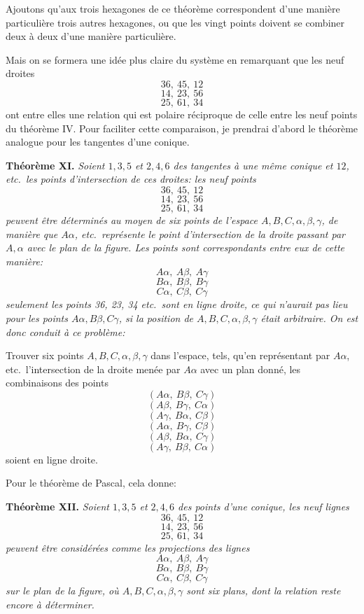 \documentclass[12pt,a4paper]{article}
\begin{document}
Ajoutons qu'aux trois hexagones de ce th\'eor\`eme correspondent d'une mani\`ere particuli\`ere trois autres hexagones, ou que les vingt points doivent se combiner deux \`a deux d'une mani\`ere particuli\`ere.

Mais on se formera une id\'ee plus claire du syst\`eme en remarquant que les neuf droites
\[
36,\ 45,\ 12
\]
\[
14,\ 23,\ 56
\]
\[
25,\ 61,\ 34
\]
ont entre elles une relation qui est polaire r\'eciproque de celle entre les neuf points du th\'eor\`eme IV. Pour faciliter cette comparaison, je prendrai d'abord le th\'eor\`eme analogue pour les tangentes d'une conique.

\textbf{Th\'eor\`eme XI.} \emph{Soient $1, 3, 5$ et $2, 4, 6$ des tangentes \`a une m\^eme conique et $12$, etc.\ les points d'intersection de ces droites: les neuf points
\[
36,\ 45,\ 12
\]
\[
14,\ 23,\ 56
\]
\[
25,\ 61,\ 34
\]
peuvent \^etre d\'etermin\'es au moyen de six points de l'espace $A, B, C, \alpha, \beta, \gamma$, de mani\`ere que $A\alpha$, etc.\ repr\'esente le point d'intersection de la droite passant par $A, \alpha$ avec le plan de la figure. Les points sont correspondants entre eux de cette mani\`ere:
\[
A\alpha,\ A\beta,\ A\gamma
\]
\[
B\alpha,\ B\beta,\ B\gamma
\]
\[
C\alpha,\ C\beta,\ C\gamma
\]
seulement les points 36, 23, 34 etc.\ sont en ligne droite, ce qui n'aurait pas lieu pour les points $A\alpha, B\beta, C\gamma$, si la position de $A, B, C, \alpha, \beta, \gamma$ \'etait arbitraire. On est donc conduit \`a ce probl\`eme:}

Trouver six points $A, B, C, \alpha, \beta, \gamma$ dans l'espace, tels, qu'en repr\'esentant par $A\alpha$, etc.\ l'intersection de la droite men\'ee par $A\alpha$ avec un plan donn\'e, les combinaisons des points
\[
(A\alpha,\ B\beta,\ C\gamma)
\]
\[
(A\beta,\ B\gamma,\ C\alpha)
\]
\[
(A\gamma,\ B\alpha,\ C\beta)
\]
\[
(A\alpha,\ B\gamma,\ C\beta)
\]
\[
(A\beta,\ B\alpha,\ C\gamma)
\]
\[
(A\gamma,\ B\beta,\ C\alpha)
\]
soient en ligne droite.

Pour le th\'eor\`eme de Pascal, cela donne:

\textbf{Th\'eor\`eme XII.} \emph{Soient $1, 3, 5$ et $2, 4, 6$ des points d'une conique, les neuf lignes
\[
36,\ 45,\ 12
\]
\[
14,\ 23,\ 56
\]
\[
25,\ 61,\ 34
\]
peuvent \^etre consid\'er\'ees comme les projections des lignes
\[
A\alpha,\ A\beta,\ A\gamma
\]
\[
B\alpha,\ B\beta,\ B\gamma
\]
\[
C\alpha,\ C\beta,\ C\gamma
\]
sur le plan de la figure, o\`u $A, B, C, \alpha, \beta, \gamma$ sont six plans, dont la relation reste encore \`a d\'eterminer.}
\end{document}
